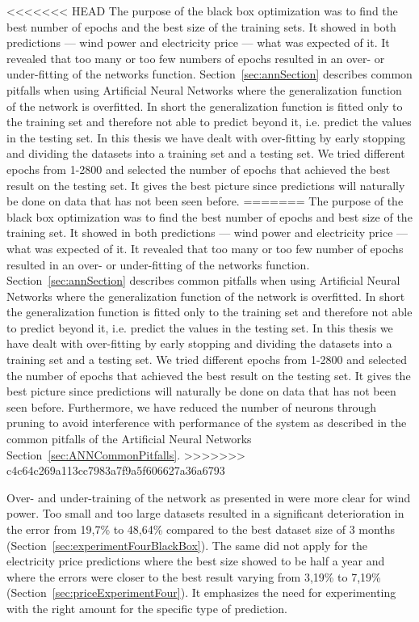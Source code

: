 <<<<<<< HEAD
The purpose of the black box optimization was to find the best number of epochs and the best size of the training sets. It showed in both predictions --- wind power and electricity price --- what was expected of it. It revealed that too many or too few numbers of epochs resulted in an over- or under-fitting of the networks function. Section~\ref{sec:annSection} describes common pitfalls when using Artificial Neural Networks where the generalization function of the network is overfitted. In short the generalization function is fitted only to the training set and therefore not able to predict beyond it, i.e. predict the values in the testing set. In this thesis we have dealt with over-fitting by early stopping and dividing the datasets into a training set and a testing set. We tried different epochs from 1-2800 and selected the number of epochs that achieved the best result on the testing set. It gives the best picture since predictions will naturally be done on data that has not been seen before.
=======
The purpose of the black box optimization was to find the best number of epochs and best size of the training set. It showed in both predictions --- wind power and electricity price --- what was expected of it. It revealed that too many or too few number of epochs resulted in an over- or under-fitting of the networks function. Section~\ref{sec:annSection} describes common pitfalls when using Artificial Neural Networks where the generalization function of the network is overfitted. In short the generalization function is fitted only to the training set and therefore not able to predict beyond it, i.e. predict the values in the testing set. In this thesis we have dealt with over-fitting by early stopping and dividing the datasets into a training set and a testing set. We tried different epochs from 1-2800 and selected the number of epochs that achieved the best result on the testing set. It gives the best picture since predictions will naturally be done on data that has not been seen before. Furthermore, we have reduced the number of neurons through pruning to avoid interference with performance of the system as described in the common pitfalls of the Artificial Neural Networks Section~\ref{sec:ANNCommonPitfalls}.
>>>>>>> c4c64c269a113cc7983a7f9a5f606627a36a6793

Over- and under-training of the network as presented in\cite{1} were more clear for wind power. Too small and too large datasets resulted in a significant deterioration in the error from 19,7\% to 48,64\% compared to the best dataset size of 3 months (Section~\ref{sec:experimentFourBlackBox}). The same did not apply for the electricity price predictions where the best size showed to be half a year and where the errors were closer to the best result varying from 3,19\% to 7,19\% (Section~\ref{sec:priceExperimentFour}). It emphasizes the need for experimenting with the right amount for the specific type of prediction.

